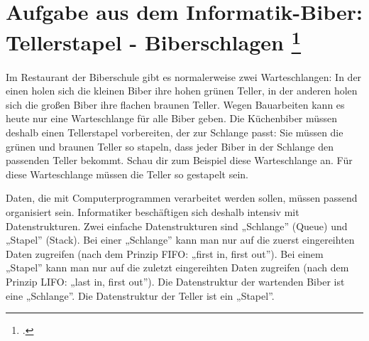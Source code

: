 \documentclass{bschlangaul-aufgabe}
\begin{document}
\section{Aufgabe aus dem Informatik-Biber: Tellerstapel - Biberschlagen
\footcite[Seite 35]{net:pdf:informatik-biber-2010}}

Im Restaurant der Biberschule gibt es normalerweise zwei Warteschlangen:
In der einen holen sich die kleinen Biber ihre hohen grünen Teller, in
der anderen holen sich die großen Biber ihre flachen braunen Teller.
Wegen Bauarbeiten kann es heute nur eine Warteschlange für alle Biber
geben. Die Küchenbiber müssen deshalb einen Tellerstapel vorbereiten,
der zur Schlange passt: Sie müssen die grünen und braunen Teller so
stapeln, dass jeder Biber in der Schlange den passenden Teller bekommt.
Schau dir zum Beispiel diese Warteschlange an. Für diese Warteschlange
müssen die Teller so gestapelt sein.

Daten, die mit Computerprogrammen verarbeitet werden sollen, müssen
passend organisiert sein. Informatiker beschäftigen sich deshalb
intensiv mit Datenstrukturen. Zwei einfache Datenstrukturen sind
„Schlange” (Queue) und „Stapel” (Stack). Bei einer „Schlange” kann man
nur auf die zuerst eingereihten Daten zugreifen (nach dem Prinzip FIFO:
„first in, first out”). Bei einem „Stapel” kann man nur auf die zuletzt
eingereihten Daten zugreifen (nach dem Prinzip LIFO: „last in, first
out”). Die Datenstruktur der wartenden Biber ist eine „Schlange”. Die
Datenstruktur der Teller ist ein „Stapel”.
\end{document}
